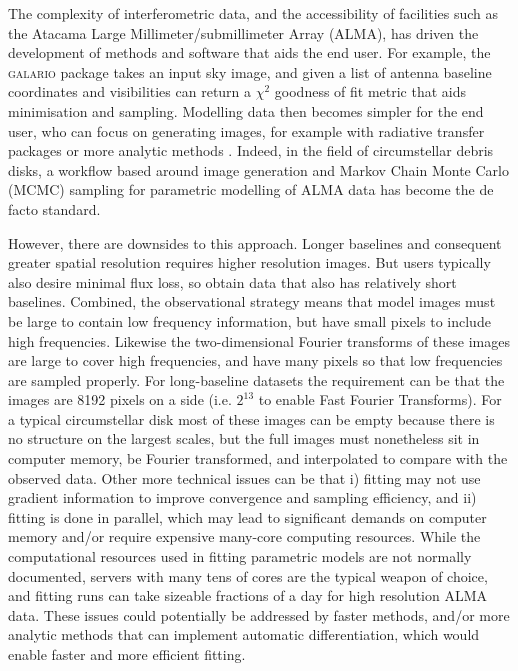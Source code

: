 \documentclass[fleqn,usenatbib]{mnras}
\begin{document}
The complexity of interferometric data, and the accessibility of facilities such as the Atacama Large Millimeter/submillimeter Array (ALMA), has driven the development of methods and software that aids the end user. For example, the \textsc{galario} package \citep{2018MNRAS.476.4527T} takes an input sky image, and given a list of antenna baseline coordinates and visibilities can return a $\chi^2$ goodness of fit metric that aids minimisation and sampling. Modelling data then becomes simpler for the end user, who can focus on generating images, for example with radiative transfer packages \citep[e.g. RADMC,][]{2012ascl.soft02015D} or more analytic methods \citep[e.g.][]{2021MNRAS.504.4497C}. Indeed, in the field of circumstellar debris disks, a workflow based around image generation and Markov Chain Monte Carlo (MCMC) sampling for parametric modelling of ALMA data has become the de facto standard.

However, there are downsides to this approach. Longer  baselines and consequent greater spatial resolution requires higher resolution images. But users typically also desire minimal flux loss, so obtain data that also has relatively short baselines.  Combined, the observational strategy means that model images must be large to contain low frequency information, but have small pixels to include high frequencies. Likewise the two-dimensional Fourier transforms of these images are large to cover high frequencies, and have many pixels so that low frequencies are sampled properly. For long-baseline datasets the requirement can be that the images are 8192 pixels on a side (i.e. $2^{13}$ to enable Fast Fourier Transforms). For a typical circumstellar disk most of these images can be empty because there is no structure on the largest scales, but the full images must nonetheless sit in computer memory, be Fourier transformed, and interpolated to compare with the observed data. Other more technical issues can be that i) fitting may not use gradient information to improve convergence and sampling efficiency, and ii) fitting is done in parallel, which may lead to significant demands on computer memory and/or require expensive many-core computing resources. While the computational resources used in fitting parametric models are not normally documented, servers with many tens of cores are the typical weapon of choice, and fitting runs can take sizeable fractions of a day for high resolution ALMA data. These issues could potentially be addressed by faster methods, and/or more analytic methods that can implement automatic differentiation, which would enable faster and more efficient fitting.
\end{document}
